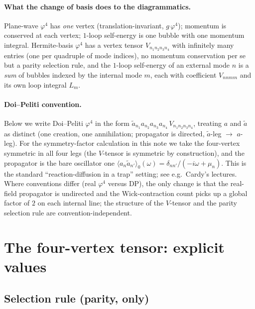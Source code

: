 \documentclass[11pt,a4paper]{article}
\begin{document}
\paragraph{What the change of basis does to the diagrammatics.} Plane-wave $\varphi^{4}$
has \emph{one} vertex (translation-invariant, $g\,\varphi^{4}$); momentum is conserved at
each vertex; $1$-loop self-energy is one bubble with one momentum integral. Hermite-basis
$\varphi^{4}$ has a vertex tensor $V_{n_{1}n_{2}n_{3}n_{4}}$ with infinitely many entries
(one per quadruple of mode indices), no momentum conservation per se but a parity
selection rule, and the $1$-loop self-energy of an external mode $n$ is a \emph{sum} of
bubbles indexed by the internal mode $m$, each with coefficient $V_{n n m m}$ and its own
loop integral $L_{m}$.

\paragraph{Doi--Peliti convention.} Below we write Doi--Peliti $\varphi^{4}$ in the form
$\widetilde a_{n_{1}}a_{n_{2}}a_{n_{3}}a_{n_{4}}\,V_{n_{1}n_{2}n_{3}n_{4}}$, treating $a$
and $\widetilde a$ as distinct (one creation, one annihilation; propagator is directed,
$\widetilde a$-leg $\to$ $a$-leg). For the symmetry-factor calculation in this note we
take the four-vertex symmetric in all four legs (the $V$-tensor is symmetric by
construction), and the propagator is the bare oscillator one
$\langle a_{n}\widetilde a_{n'}\rangle_{0}(\omega) = \delta_{n n'}/(-i\omega + \mu_{n})$.
This is the standard ``reaction-diffusion in a trap'' setting; see e.g.\ Cardy's lectures.
Where conventions differ (real $\varphi^{4}$ versus DP), the only change is that the
real-field propagator is undirected and the Wick-contraction count picks up a global
factor of $2$ on each internal line; the structure of the $V$-tensor and the parity
selection rule are convention-independent.

\section{The four-vertex tensor: explicit values}

\subsection{Selection rule (parity, only)}
\end{document}
